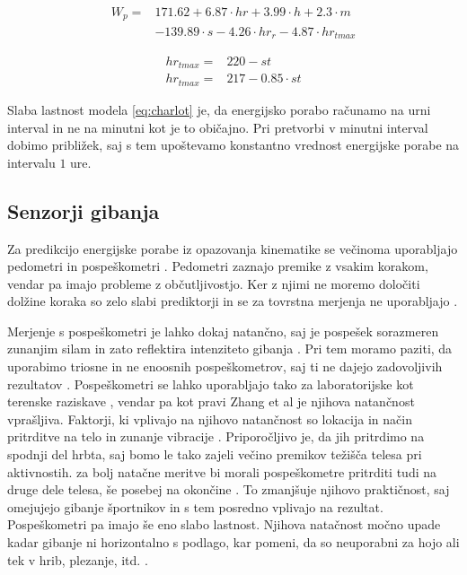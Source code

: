\begin{align}\label{eq:charlot}
W_p = & 171.62 + 6.87 \cdot hr + 3.99 \cdot h + 2.3 \cdot m \nonumber \\
& - 139.89 \cdot s - 4.26 \cdot hr_r - 4.87 \cdot hr_{tmax}
\end{align}

\begin{align}
	hr_{tmax} = & 220 - st \label{eq:hrtmax1}\\ 
    hr_{tmax} = & 217 - 0.85 \cdot st \label{eq:hrtmax2}
\end{align}

Slaba lastnost modela \eqref{eq:charlot} je, da energijsko porabo računamo na urni interval in ne na minutni kot je to običajno. Pri pretvorbi v minutni interval dobimo približek, saj s tem upoštevamo konstantno vrednost energijske porabe na intervalu $1$ ure. 





\subsection{Senzorji gibanja}\label{sec:senzorji-gibanja}

Za predikcijo energijske porabe iz opazovanja kinematike se večinoma uporabljajo pedometri in pospeškometri \cite{levine2005measurement}. Pedometri zaznajo premike z vsakim korakom, vendar pa imajo probleme z občutljivostjo. Ker  z njimi ne moremo določiti dolžine koraka so zelo slabi prediktorji in se za tovrstna merjenja ne uporabljajo \cite{levine2005measurement}.

Merjenje s pospeškometri je lahko dokaj natančno, saj je pospešek sorazmeren zunanjim silam in zato reflektira intenziteto gibanja \cite{yang2010review}. Pri tem moramo paziti, da uporabimo triosne in ne enoosnih pospeškometrov, saj ti ne dajejo zadovoljivih rezultatov \cite{levine2005measurement}. Pospeškometri se lahko uporabljajo tako za laboratorijske kot terenske raziskave \cite{yang2014sleep}, vendar pa kot pravi Zhang et al \cite{zhang2004improving} je njihova natančnost vprašljiva. Faktorji, ki vplivajo na njihovo natančnost so lokacija in način pritrditve na telo in zunanje vibracije \cite{yang2010review}. Priporočljivo je, da jih pritrdimo na spodnji del hrbta, saj bomo le tako zajeli večino premikov težišča telesa pri aktivnostih. za bolj natačne meritve bi morali pospeškometre pritrditi tudi na druge dele telesa, še posebej na okončine \cite{yang2010review}. To zmanjšuje njihovo praktičnost, saj omejujejo gibanje športnikov in s tem posredno vplivajo na rezultat. Pospeškometri pa imajo še eno slabo lastnost. Njihova natačnost močno upade kadar gibanje ni horizontalno s podlago, kar pomeni, da so neuporabni za hojo ali tek v hrib, plezanje, itd. \cite{yang2010review}.


